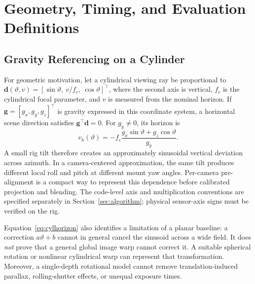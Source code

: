 \section{Geometry, Timing, and Evaluation Definitions}
\label{sec:problem}
\subsection{Gravity Referencing on a Cylinder}
For geometric motivation, let a cylindrical viewing ray be proportional to
$\mathbf d(\vartheta,v)=[\sin\vartheta,\ v/f_c,\ \cos\vartheta]^\top$, where the second axis is vertical, $f_c$ is the cylindrical focal parameter, and $v$ is measured from the nominal horizon. If $\mathbf g=[g_x,g_y,g_z]^\top$ is gravity expressed in this coordinate system, a horizontal scene direction satisfies $\mathbf g^\top\mathbf d=0$. For $g_y\ne0$, its horizon is
\begin{equation}
 v_h(\vartheta)=-f_c\frac{g_x\sin\vartheta+g_z\cos\vartheta}{g_y}.
 \label{eq:cylhorizon}
\end{equation}
A small rig tilt therefore creates an approximately sinusoidal vertical deviation across azimuth. In a camera-centered approximation, the same tilt produces different local roll and pitch at different mount yaw angles. Per-camera pre-alignment is a compact way to represent this dependence before calibrated projection and blending. The code-level axis and multiplication conventions are specified separately in Section~\ref{sec:algorithm}; physical sensor-axis signs must be verified on the rig.

Equation~\eqref{eq:cylhorizon} also identifies a limitation of a planar baseline: a correction $a\vartheta+b$ cannot in general cancel the sinusoid across a wide field. It does \emph{not} prove that a general global image warp cannot correct it. A suitable spherical rotation or nonlinear cylindrical warp can represent that transformation. Moreover, a single-depth rotational model cannot remove translation-induced parallax, rolling-shutter effects, or unequal exposure times.

